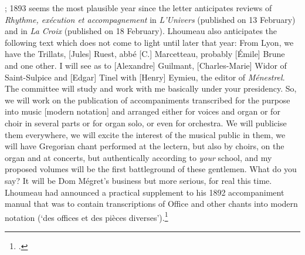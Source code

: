   {; 1893 seems the most plausible year since the letter anticipates reviews of \emph{Rhythme, exécution et accompagnement} in \emph{L'Univers} (published on 13 February) and in \emph{La Croix} (published on 18 February). Lhoumeau also anticipates the following text which does not come to light until later that year: \cite{Comirechantgregorienrythme1893}}
{From Lyon, we have the Trillats, [Jules] Ruest, abbé [C.] Marcetteau, probably [Émile] Brune and one other. I will see as to [Alexandre] Guilmant, [Charles-Marie] Widor of Saint-Sulpice and [Edgar] Tinel with [Henry] Eymieu, the editor of \emph{Ménestrel}.
The committee will study and work with me basically under your presidency. So, we will work on the publication of accompaniments transcribed for the purpose into music [modern notation] and arranged either for voices and organ or for choir in several parts or for organ solo, or even for orchestra.
We will publicise them everywhere, we will excite the interest of the musical public in them, we will have Gregorian chant performed at the lectern, but also by choirs, on the organ and at concerts, but authentically according to \emph{your} school, and my proposed volumes will be the first battleground of these gentlemen. What do you say? It will be Dom Mégret's business but more serious, for real this time.}
%
\noindent
Lhoumeau had announced a practical supplement to his 1892 accompaniment manual that was to contain transcriptions of Office and other chants into modern notation (`des offices et des pièces diverses').\footcite[pp.~xviii--xix, 312--20]{LhoumeauRhythmeexecutionaccompagnement1892}
